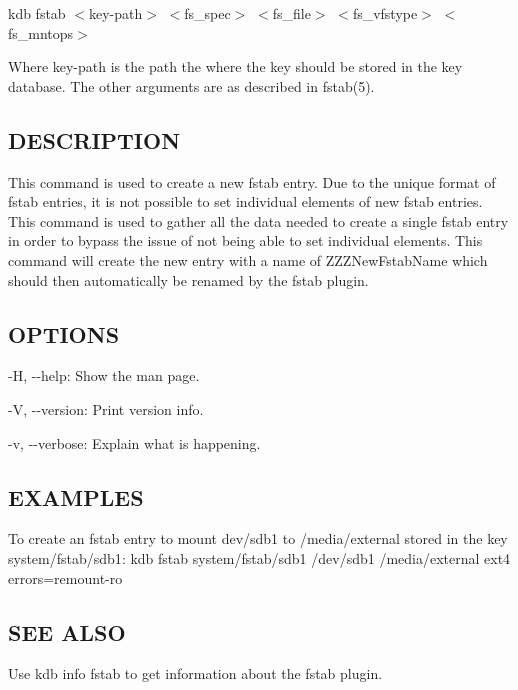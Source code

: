 {\ttfamily kdb fstab $<$key-\/path$>$ $<$fs\+\_\+spec$>$ $<$fs\+\_\+file$>$ $<$fs\+\_\+vfstype$>$ $<$fs\+\_\+mntops$>$}

Where {\ttfamily key-\/path} is the path the where the key should be stored in the key database. The other arguments are as described in fstab(5).

\subsection*{D\+E\+S\+C\+R\+I\+P\+T\+I\+O\+N}

This command is used to create a new {\ttfamily fstab} entry. Due to the unique format of {\ttfamily fstab} entries, it is not possible to set individual elements of new {\ttfamily fstab} entries. This command is used to gather all the data needed to create a single {\ttfamily fstab} entry in order to bypass the issue of not being able to set individual elements. This command will create the new entry with a name of {\ttfamily Z\+Z\+Z\+New\+Fstab\+Name} which should then automatically be renamed by the {\ttfamily fstab} plugin.

\subsection*{O\+P\+T\+I\+O\+N\+S}


\begin{DoxyItemize}
\item {\ttfamily -\/\+H}, {\ttfamily -\/-\/help}\+: Show the man page.
\item {\ttfamily -\/\+V}, {\ttfamily -\/-\/version}\+: Print version info.
\item {\ttfamily -\/v}, {\ttfamily -\/-\/verbose}\+: Explain what is happening.
\end{DoxyItemize}

\subsection*{E\+X\+A\+M\+P\+L\+E\+S}

To create an fstab entry to mount {\ttfamily dev/sdb1} to {\ttfamily /media/external} stored in the key {\ttfamily system/fstab/sdb1}\+: {\ttfamily kdb fstab system/fstab/sdb1 /dev/sdb1 /media/external ext4 errors=remount-\/ro}

\subsection*{S\+E\+E A\+L\+S\+O}


\begin{DoxyItemize}
\item Use {\ttfamily kdb info fstab} to get information about the fstab plugin. 
\end{DoxyItemize}